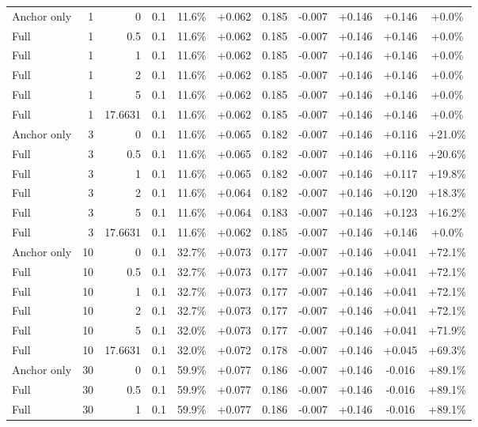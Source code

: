 \begin{table}[htbp]
\begin{tabular}{lrrrccccccc}
Anchor only & 1 & 0 & 0.1 & 11.6\% & +0.062 & 0.185 & -0.007 & +0.146 & +0.146 & +0.0\% \\
Full & 1 & 0.5 & 0.1 & 11.6\% & +0.062 & 0.185 & -0.007 & +0.146 & +0.146 & +0.0\% \\
Full & 1 & 1 & 0.1 & 11.6\% & +0.062 & 0.185 & -0.007 & +0.146 & +0.146 & +0.0\% \\
Full & 1 & 2 & 0.1 & 11.6\% & +0.062 & 0.185 & -0.007 & +0.146 & +0.146 & +0.0\% \\
Full & 1 & 5 & 0.1 & 11.6\% & +0.062 & 0.185 & -0.007 & +0.146 & +0.146 & +0.0\% \\
Full & 1 & 17.6631 & 0.1 & 11.6\% & +0.062 & 0.185 & -0.007 & +0.146 & +0.146 & +0.0\% \\
Anchor only & 3 & 0 & 0.1 & 11.6\% & +0.065 & 0.182 & -0.007 & +0.146 & +0.116 & +21.0\% \\
Full & 3 & 0.5 & 0.1 & 11.6\% & +0.065 & 0.182 & -0.007 & +0.146 & +0.116 & +20.6\% \\
Full & 3 & 1 & 0.1 & 11.6\% & +0.065 & 0.182 & -0.007 & +0.146 & +0.117 & +19.8\% \\
Full & 3 & 2 & 0.1 & 11.6\% & +0.064 & 0.182 & -0.007 & +0.146 & +0.120 & +18.3\% \\
Full & 3 & 5 & 0.1 & 11.6\% & +0.064 & 0.183 & -0.007 & +0.146 & +0.123 & +16.2\% \\
Full & 3 & 17.6631 & 0.1 & 11.6\% & +0.062 & 0.185 & -0.007 & +0.146 & +0.146 & +0.0\% \\
Anchor only & 10 & 0 & 0.1 & 32.7\% & +0.073 & 0.177 & -0.007 & +0.146 & +0.041 & +72.1\% \\
Full & 10 & 0.5 & 0.1 & 32.7\% & +0.073 & 0.177 & -0.007 & +0.146 & +0.041 & +72.1\% \\
Full & 10 & 1 & 0.1 & 32.7\% & +0.073 & 0.177 & -0.007 & +0.146 & +0.041 & +72.1\% \\
Full & 10 & 2 & 0.1 & 32.7\% & +0.073 & 0.177 & -0.007 & +0.146 & +0.041 & +72.1\% \\
Full & 10 & 5 & 0.1 & 32.0\% & +0.073 & 0.177 & -0.007 & +0.146 & +0.041 & +71.9\% \\
Full & 10 & 17.6631 & 0.1 & 32.0\% & +0.072 & 0.178 & -0.007 & +0.146 & +0.045 & +69.3\% \\
Anchor only & 30 & 0 & 0.1 & 59.9\% & +0.077 & 0.186 & -0.007 & +0.146 & -0.016 & +89.1\% \\
Full & 30 & 0.5 & 0.1 & 59.9\% & +0.077 & 0.186 & -0.007 & +0.146 & -0.016 & +89.1\% \\
Full & 30 & 1 & 0.1 & 59.9\% & +0.077 & 0.186 & -0.007 & +0.146 & -0.016 & +89.1\% \\

\end{tabular}
\end{table}

